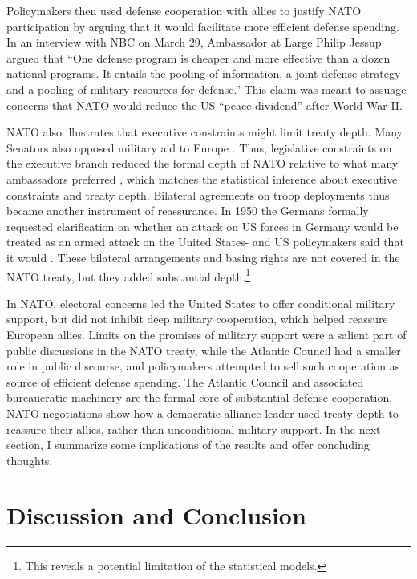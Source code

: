 \documentclass[12pt]{article}
\begin{document}
Policymakers then used defense cooperation with allies to justify NATO participation by arguing that it would facilitate more efficient defense spending. 
In an interview with NBC on March 29, Ambassador at Large Philip Jessup argued that ``One defense program is cheaper and more effective than a dozen national programs. It entails the pooling of information, a joint defense strategy and a pooling of military resources for defense.''
This claim was meant to assuage concerns that NATO would reduce the US ``peace dividend'' after World War II. 


NATO also illustrates that executive constraints might limit treaty depth. 
Many Senators also opposed military aid to Europe \citep[pg 285]{Acheson1969}. 
Thus, legislative constraints on the executive branch reduced the formal depth of NATO relative to what many ambassadors preferred \citep[pg 277]{Acheson1969}, which matches the statistical inference about executive constraints and treaty depth.  
Bilateral agreements on troop deployments thus became another instrument of reassurance. 
In 1950 the Germans formally requested clarification on whether an attack on US forces in Germany would be treated as an armed attack on the United States- and US policymakers said that it would \citep[pg. 395]{Acheson1969}.  
These bilateral arrangements and basing rights are not covered in the NATO treaty, but they added substantial depth.\footnote{This reveals a potential limitation of the statistical models.}  


In NATO, electoral concerns led the United States to offer conditional military support, but did not inhibit deep military cooperation, which helped reassure European allies. 
Limits on the promises of military support were a salient part of public discussions in the NATO treaty, while the Atlantic Council had a smaller role in public discourse, and policymakers attempted to sell such cooperation as source of efficient defense spending. 
The Atlantic Council and associated bureaucratic machinery are the formal core of substantial defense cooperation. 
NATO negotiations show how a democratic alliance leader used treaty depth to reassure their allies, rather than unconditional military support. 
In the next section, I summarize some implications of the results and offer concluding thoughts. 



\section{Discussion and Conclusion} 
\end{document}
